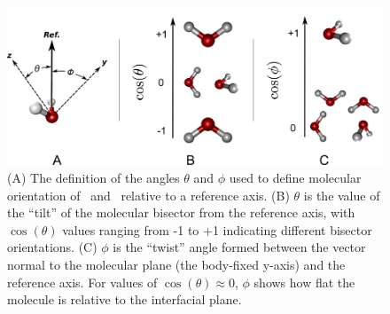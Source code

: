 \begin{figure}[h!]
	\begin{center}
		\includegraphics[scale=1.0]{images/angle-cartoons/molecular-angles.png}
		\caption{(A) The definition of the angles $\theta$ and $\phi$ used to define molecular orientation of \suldiox~and \wat~relative to a reference axis. (B) $\theta$ is the value of the ``tilt'' of the molecular bisector from the reference axis, with $\cos(\theta)$ values ranging from -1 to +1 indicating different bisector orientations. (C) $\phi$ is the ``twist'' angle formed between the vector normal to the molecular plane (the body-fixed y-axis) and the reference axis. For values of $\cos(\theta) \approx 0$, $\phi$ shows how flat the molecule is relative to the interfacial plane.}
		\label{fig:water-angles}
	\end{center}
\end{figure}

